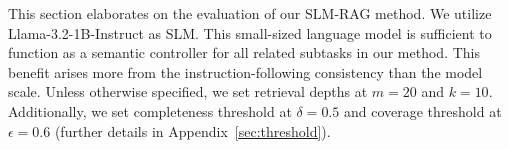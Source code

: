 This section elaborates on the evaluation of our SLM-RAG method.
We utilize Llama-3.2-1B-Instruct as SLM.
This small-sized language model is sufficient to function as a semantic controller for all related subtasks in our method.
This benefit arises more from the instruction-following consistency than the model scale.
Unless otherwise specified, we set retrieval depths at $m=20$ and $k=10$.
Additionally, we set completeness threshold at $\delta=0.5$ and coverage threshold at $\epsilon=0.6$ (further details in Appendix~\ref{sec:threshold}).


